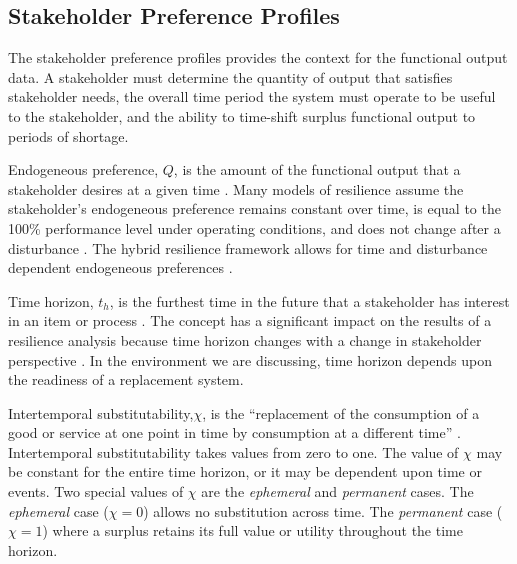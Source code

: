 \documentclass[preprint,12pt]{elsarticle}
\begin{document}
\subsection{Stakeholder Preference Profiles}
The stakeholder preference profiles provides the context for the
functional output data. A stakeholder must determine the quantity of
output that satisfies stakeholder needs, the overall time period the
system must operate to be useful to the stakeholder, and the ability
to time-shift surplus functional output to periods of shortage.


Endogeneous preference, $Q$, is the amount of the functional output
that a stakeholder desires at a given time \cite{Black2013}.  Many
models of resilience assume the stakeholder's endogeneous preference
remains constant over time, is equal to the 100\% 
performance level under operating conditions, and does not change
after a disturbance \cite{Emanuel2017}. The hybrid resilience
framework allows for time and disturbance dependent endogeneous
preferences \cite{emanuel2018,emanuel2019}.

Time horizon, $t_h$, is the furthest time in the future that a
stakeholder has interest in an item or process \cite{Black2013}. The
concept has a significant impact on the results of a resilience
analysis because time horizon changes with a change in stakeholder
perspective \cite{emanuel2018,emanuel2019}. In the environment we are discussing,
time horizon depends upon the readiness of a replacement system.


Intertemporal substitutability,$\chi$, is the ``replacement of the consumption
of a good or service at one point in time by consumption at a
different time'' \cite{Black2013}. Intertemporal substitutability takes 
values from zero to one. The value of $\chi$ may be constant for the
entire time horizon, or it may be dependent upon time or events. Two
special values of $\chi$ are the \emph{ephemeral} and \emph{permanent}
cases. The \emph{ephemeral} case ($\chi = 0$) allows no substitution across
time.  The  \emph{permanent} case ($\chi = 1$) where a
surplus retains its full value or utility throughout the time
horizon. 
\end{document}
